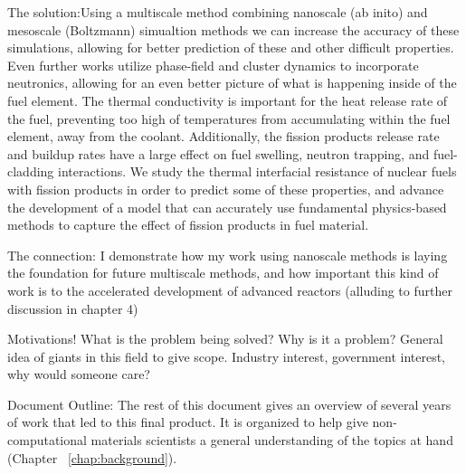 The solution:Using a multiscale method combining nanoscale (ab inito) and mesoscale (Boltzmann) simualtion methods we can increase the accuracy of these simulations, allowing for better prediction of these and other difficult properties. Even further works utilize phase-field and cluster dynamics to incorporate neutronics, allowing for an even better picture of what is happening inside of the fuel element. The thermal conductivity is important for the heat release rate of the fuel, preventing too high of temperatures from accumulating within the fuel element, away from the coolant. Additionally, the fission products release rate and buildup rates have a large effect on fuel swelling, neutron trapping, and fuel-cladding interactions. We study the thermal interfacial resistance of nuclear fuels with fission products in order to predict some of these properties, and advance the development of a model that can accurately use fundamental physics-based methods to capture the effect of fission products in fuel material.


The connection: I demonstrate how my work using nanoscale methods is laying the foundation for future multiscale methods, and how important this kind of work is to the accelerated development of advanced reactors (alluding to further discussion in chapter 4)


Motivations! What is the problem being solved? Why is it a problem? General idea of giants in this field to give scope. Industry interest, government interest, why would someone care?

Document Outline: The rest of this document gives an overview of several years of work that led to this final product. It is organized to help give non-computational materials scientists a general understanding of the topics at hand (Chapter ~\ref{chap:background}).


\clearpage


